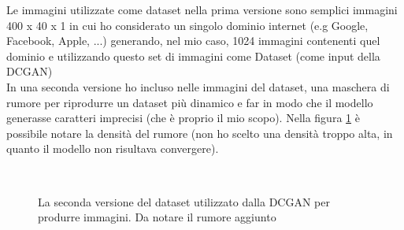 Le immagini utilizzate come dataset nella prima versione sono semplici immagini 400 x 40 x 1 in cui ho considerato un singolo dominio internet (e.g Google, Facebook, Apple, ...) generando, nel mio caso, 1024 immagini contenenti quel dominio e utilizzando questo set di immagini come Dataset (come input della DCGAN)\\
In una seconda versione ho incluso nelle immagini del dataset, una maschera di rumore per riprodurre un dataset più dinamico e far in modo che il modello generasse caratteri imprecisi (che è proprio il mio scopo). Nella figura \ref{fig:ou2} è possibile notare la densità del rumore (non ho scelto una densità troppo alta, in quanto il modello non risultava convergere).
\begin{figure}[!h]
  \centering
  \begin{minipage}[b]{0.5\textwidth}
    \label{}
  \end{minipage}
  \begin{minipage}[b]{0.5\textwidth}
    \label{}
  \end{minipage}\\
  \begin{minipage}[b]{0.5\textwidth}
    \label{}
  \end{minipage}
  \begin{minipage}[b]{0.5\textwidth}
    \caption{La seconda versione del dataset utilizzato dalla DCGAN per produrre immagini. Da notare il rumore aggiunto}
    \label{fig:ou2}
  \end{minipage}
\end{figure}\\
